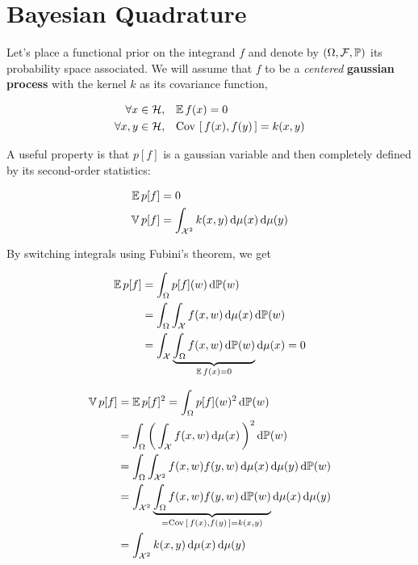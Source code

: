 
\section{Bayesian Quadrature}
\label{sec:BQ}
Let's place a functional prior on the integrand $f$ and denote by $(\Omega, \mathcal{F}, \P)$ its probability space associated. We will assume that $f$ to be
 a \textit{centered} \textbf{gaussian process} with the kernel $k$ as its covariance
 function, \ie
 \begin{boxexample}
   \begin{align*}
     \forall x \in \H, \quad  &\Expec{f(x)} = 0\\
     \forall x, y \in \H, \quad  &\Cov{f(x)}{f(y)} = k(x,y)
   \end{align*}
 \end{boxexample}
A useful property is that $p[f]$ is a gaussian variable and then completely defined by its second-order statistics:
\begin{boxtheorem}
  \begin{align}
    \Expec{p[f]} &= 0\\
    \Var{p[f]} &= \int_{\X^2} k(x,y) \d \mu(x) \d \mu(y)
  \end{align}
\end{boxtheorem}


  By switching integrals using Fubini's theorem, we get
  \begin{boxcomputation}
    \begin{align*}
      \Expec{p[f]} &= \int_{\Omega} p[f](w) \d \P(w)\\
      &= \int_{\Omega} \int_{\X} f(x,w) \d \mu(x)  \d \P(w)\\
      &= \int_{\X} \underbrace{\int_{\Omega}  f(x,w) \d \P(w)}_{\Expec{f(x)}=0} \d \mu(x)  =0
    \end{align*}
\end{boxcomputation}
\begin{boxcomputation}
  \begin{align*}
      \Var{p[f]} &= \Expec{p[f]^2} = \int_{\Omega} p[f](w)^2 \d \P(w)\\
      &=\int_{\Omega} \prt{\int_{\X} f(x,w) \d \mu(x)}^2 \d \P(w)\\
      &=\int_{\Omega} \int_{\X^2} f(x,w)f(y,w) \d \mu(x) \d \mu(y) \d \P(w)\\
      &= \int_{\X^2} \underbrace{\int_{\Omega}  f(x,w)f(y,w) \d \P(w)}_{=\Cov{f(x)}{f(y)} = k(x,y)} \d \mu(x) \d \mu(y) \\
      &= \int_{\X^2}  k(x,y) \d \mu(x) \d \mu(y)
    \end{align*}
\end{boxcomputation}

